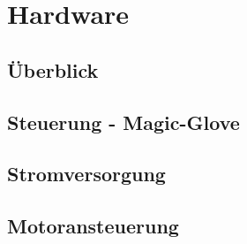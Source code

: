 \chapter{Hardware}

\section{Überblick}
\section{Steuerung - Magic-Glove}
\section{Stromversorgung}
\section{Motoransteuerung}

